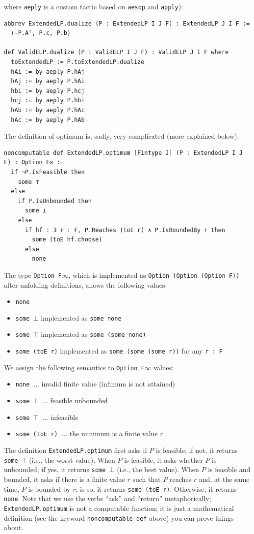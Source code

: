\documentclass[]{article}
\renewcommand{\.}{\hskip .75pt}
\begin{document}
where \texttt{aeply} is a custom tactic based on \texttt{aesop} \cite{Aesop}
and \texttt{apply}):
\begin{lstlisting}
abbrev ExtendedLP.dualize (P : ExtendedLP I J F) : ExtendedLP J I F :=
  ⟨-P.Aᵀ, P.c, P.b⟩

def ValidELP.dualize (P : ValidELP I J F) : ValidELP J I F where
  toExtendedLP := P.toExtendedLP.dualize
  hAi := by aeply P.hAj
  hAj := by aeply P.hAi
  hbi := by aeply P.hcj
  hcj := by aeply P.hbi
  hAb := by aeply P.hAc
  hAc := by aeply P.hAb
\end{lstlisting}
The definition of optimum is, sadly, very complicated (more explained below):
\begin{lstlisting}
noncomputable def ExtendedLP.optimum [Fintype J] (P : ExtendedLP I J F) : Option F∞ :=
  if ¬P.IsFeasible then
    some ⊤
  else
    if P.IsUnbounded then
      some ⊥
    else
      if hf : ∃ r : F, P.Reaches (toE r) ∧ P.IsBoundedBy r then
        some (toE hf.choose)
      else
        none
\end{lstlisting}
The type \texttt{Option F$\infty$}, which is implemented as
\texttt{Option (Option (Option F))} after unfolding definitions,
allows the following values:
\begin{itemize}
\item \texttt{none}
\item \texttt{some $\bot$} implemented as \texttt{some none}
\item \texttt{some $\top$} implemented as \texttt{some (some none)}
\item \texttt{some (toE r)} implemented as \texttt{some (some (some r))} for any \texttt{r :~F}
\end{itemize}
We assign the following semantics to \texttt{Option F$\infty$} values:
\begin{itemize}
\item \texttt{none} $\ \dots$ invalid finite value (infimum is not attained)
\item \texttt{some $\bot$} $\ \dots$ feasible unbounded
\item \texttt{some $\top$} $\ \dots$ infeasible
\item \texttt{some (toE r)} $\ \dots$ the minimum is a finite value $r$
\end{itemize}
The definition \texttt{ExtendedLP.optimum} first asks if $P$ is feasible;
if not, it returns \texttt{some $\top$} (i.e., the worst value).
When $P$ is feasible, it asks whether $P$ is unbounded; if yes, it returns \texttt{some $\bot$}
(i.e., the best value).
When $P$ is feasible and bounded,
it asks if there is a finite value $r$ such that $P$ reaches $r$ and, at the same time,
$P$ is bounded by $r$; is so, it returns \texttt{some (toE r)}.
Otherwise, it returns \texttt{none}.
Note that we use the verbs ``ask'' and ``return'' metaphorically;
\texttt{ExtendedLP.optimum} is not a computable function; it is just a mathematical
definition (see the keyword \texttt{noncomputable def} above) you can prove things about.
\end{document}
